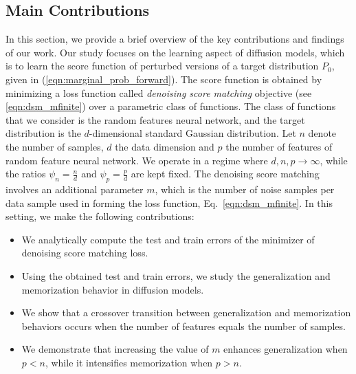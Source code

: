
\subsection{Main Contributions}\label{sec:main_contributions}
In this section, we provide a brief overview of the key contributions and findings of our work. Our study focuses on the learning aspect of diffusion models, which is to learn the score function of perturbed versions of a target distribution $P_0$, given in (\ref{eqn:marginal_prob_forward}). The score function is obtained by minimizing a loss function called \textit{denoising score matching} objective (see \ref{eqn:dsm_mfinite}) over a parametric class of functions. The class of functions that we consider is the random features neural network, and the target distribution is the $d$-dimensional standard Gaussian distribution. Let $n$ denote the number of samples, $d$ the data dimension and $p$ the number of features of random feature neural network. We operate in a regime where $d,n,p\rightarrow\infty$, while the ratios $\psi_n = \frac{n}{d}$ and $\psi_p=\frac{p}{d}$ are kept fixed. The denoising score matching involves an additional parameter $m$, which is the number of noise samples per data sample used in forming the loss function, Eq.~\eqref{eqn:dsm_mfinite}. In this setting, we make the following contributions:  
\begin{itemize}
    \item We analytically compute the  test and train errors of the minimizer of denoising score matching loss.
    \item Using the obtained test and train errors, we study the generalization and memorization behavior in diffusion models.
    \item We show that a crossover transition between generalization and memorization behaviors occurs when the number of features equals the number of samples. %
    \item We demonstrate that increasing the value of $m$ enhances generalization when $p<n$, while it intensifies memorization when $p>n$.
\end{itemize}

